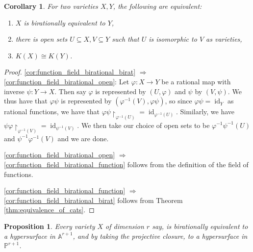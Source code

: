 \documentclass[12pt]{article}
\theoremstyle{plain}
\newtheorem{proposition}[thm]{Proposition}
\newtheorem{cor}[thm]{Corollary}
\theoremstyle{definition}
\newcommand{\bb}[1]{\mathbb{#1}}
\newcommand{\lto}{\longrightarrow}
\begin{document}
\begin{cor}\label{cor:function_field_birational}
For two varieties $X,Y$, the following are equivalent:
\begin{enumerate}
\item\label{cor:function_field_birational_birat} $X$ is birationally equivalent to $Y$,
\item\label{cor:function_field_birational_open} there is open sets $U \subseteq X, V \subseteq Y$ such that $U$ is isomorphic to $V$ as varieties,
\item\label{cor:function_field_birational_function} $K(X) \cong K(Y)$.
\end{enumerate}
\end{cor}
\begin{proof}
\eqref{cor:function_field_birational_birat} $\Longrightarrow$ \eqref{cor:function_field_birational_open}: Let $\varphi: X \lto Y$ be a rational map with inverse $\psi: Y \lto X$. Then say $\varphi$ is represented by $(U, \varphi)$ and $\psi$ by $(V,\psi)$. We thus have that $\varphi \psi$ is represented by $(\varphi^{-1}(V), \varphi \psi)$, so since $\varphi \psi = \operatorname{id}_Y$ as rational functions, we have that $\varphi \psi\restriction_{\varphi^{-1}(U)} = \operatorname{id}_{\varphi^{-1}(U)}$. Similarly, we have $\psi\varphi\restriction_{\varphi^{-1}(V)} = \operatorname{id}_{\psi^{-1}(V)}$. We then take our choice of open sets to be $\varphi^{-1}\psi^{-1}(U)$ and $\psi^{-1}\varphi^{-1}(V)$ and we are done.

\eqref{cor:function_field_birational_open} $\Longrightarrow$ \eqref{cor:function_field_birational_function} follows from the definition of the field of functions.

\eqref{cor:function_field_birational_function} $\Longrightarrow$ \eqref{cor:function_field_birational_birat} follows from Theorem \eqref{thm:equivalence_of_cats}.
\end{proof}
\begin{proposition}\label{prop:hypersurface}
Every variety $X$ of dimension $r$ say, is birationally equivalent to a hypersurface in $\bb{A}^{r+1}$, and by taking the projective closure, to a hypersurface in $\bb{P}^{r+1}$.
\end{proposition}
\end{document}
